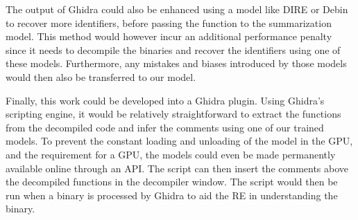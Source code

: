 The output of Ghidra could also be enhanced using a model like DIRE \cite{Dire} or Debin \cite{Debin} to recover more identifiers, before passing the function to the summarization model. This method would however incur an additional performance penalty since it needs to decompile the binaries and recover the identifiers using one of these models. Furthermore, any mistakes and biases introduced by those models would then also be transferred to our model.




Finally, this work could be developed into a Ghidra plugin. Using Ghidra's scripting engine, it would be relatively straightforward to extract the functions from the decompiled code and infer the comments using one of our trained models. To prevent the constant loading and unloading of the model in the GPU, and the requirement for a GPU, the models could even be made permanently available online through an API. The script can then insert the comments above the decompiled functions in the decompiler window. The script would then be run when a binary is processed by Ghidra to aid the RE in understanding the binary.


